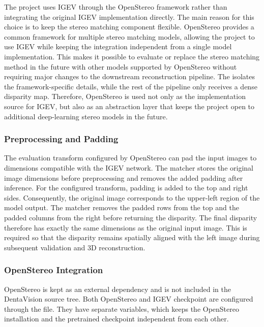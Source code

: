 The project uses IGEV through the OpenStereo framework rather than integrating
the original IGEV implementation directly.
The main reason for this choice is to keep the stereo matching component
flexible. OpenStereo provides a common framework for multiple stereo matching
models, allowing the project to use IGEV while keeping the integration
independent from a single model implementation.
This makes it possible to evaluate or replace the stereo matching method in
the future with other models supported by OpenStereo without requiring major
changes to the downstream reconstruction pipeline. The
 isolates the framework-specific details, while the rest of
the pipeline only receives a dense disparity map.
Therefore, OpenStereo is used not only as the implementation source for IGEV,
but also as an abstraction layer that keeps the project open to additional
deep-learning stereo models in the future.

\subsubsection{Preprocessing and Padding}

The evaluation transform configured by OpenStereo can pad the input images to
dimensions compatible with the IGEV network. The matcher stores the original
image dimensions before preprocessing and removes the added padding after
inference.
For the configured transform, padding is added to the top and right sides.
Consequently, the original image corresponds to the upper-left region of the
model output. The matcher removes the padded rows from the top and the padded
columns from the right before returning the disparity.
The final disparity therefore has exactly the same dimensions as the original
input image. This is required so that the disparity remains spatially aligned
with the left image during subsequent validation and 3D reconstruction.

\subsubsection{OpenStereo Integration}

OpenStereo is kept as an external dependency and is not included in the
DentaVision source tree. Both OpenStereo and IGEV checkpoint are configured through the  file. They have separate variables, which keeps the OpenStereo installation and the pretrained checkpoint independent from each other.


